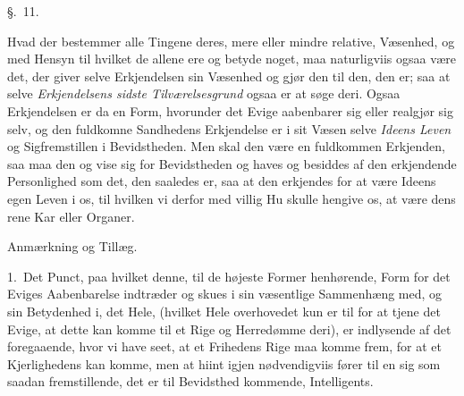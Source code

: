 \documentclass[12pt,a4paper]{book}
\newcommand{\apage}[1]{\marginnote{\footnotesize\textit{[#1]}}}
\begin{document}
\begin{center}\large\S.~11.\end{center} \apage{112} 

Hvad der bestemmer alle Tingene deres, mere eller mindre relative, Væsenhed, og
med Hensyn til hvilket de allene ere og betyde noget, maa naturligviis ogsaa være
det, der giver selve Erkjendelsen sin Væsenhed og gjør den til den, den er; saa at
selve \emph{Erkjendelsens sidste Tilværelsesgrund} ogsaa er at søge deri. Ogsaa
Erkjendelsen er da en Form, hvorunder det Evige aabenbarer sig eller realgjør sig
selv, og den fuldkomne Sandhedens Erkjendelse er i sit Væsen selve \emph{Ideens
Leven} og Sigfremstillen i Bevidstheden. Men skal den være en fuldkommen
Erkjenden, saa maa den og vise sig for Bevidstheden og haves og besiddes af den
erkjendende Personlighed som det, den saaledes er, saa at den erkjendes for at
være Ideens egen Leven i os, til hvilken vi derfor med villig Hu skulle hengive
os, at være dens rene Kar eller Organer.

\begin{center}Anmærkning og Tillæg.\end{center}

1.~Det Punct, paa hvilket denne, til de højeste Former henhørende, Form for det
Eviges Aabenbarelse indtræder og skues i sin væsentlige Sammenhæng med, og sin
Betydenhed i, det Hele, (hvilket Hele overhovedet kun er til for at tjene det
Evige, at dette kan komme til et Rige og Herredømme deri), er indlysende af det
foregaaende, \apage{113}  hvor vi have seet, at et Frihedens Rige maa komme frem, for at et
Kjerlighedens kan komme, men at hiint igjen nødvendigviis fører til en sig som
saadan fremstillende, det er til Bevidsthed kommende, Intelligents.
\end{document}
